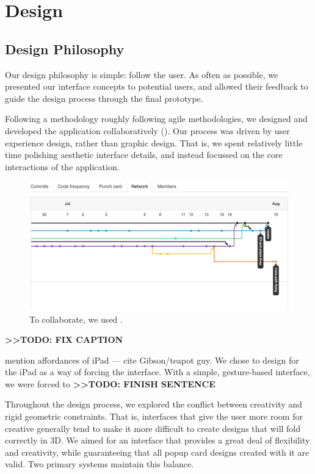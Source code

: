\chapter{Design}

\section{Design Philosophy}\label{design-philosophy}

Our design philosophy is simple: follow the user. As often as possible,
we presented our interface concepts to potential users, and allowed
their feedback to guide the design process through the final prototype.

Following a methodology roughly following agile methodologies, we
designed and developed the application collaboratively
(\citet{martin2003agile}). Our process was driven by user experience
design, rather than graphic design. That is, we spent relatively little
time polishing aesthetic interface details, and instead focussed on the
core interactions of the application.

\begin{figure}[htbp]
\centering
\includegraphics{figures/30_UI_Design_Philosophy/gitflow.png}
\caption{To collaborate, we used .}
\end{figure}

\textbf{\textgreater{}\textgreater{}TODO: FIX CAPTION}

mention affordances of iPad --- cite Gibson/teapot guy. We chose to
design for the iPad as a way of forcing the interface. With a simple,
gesture-based interface, we were forced to
\textbf{\textgreater{}\textgreater{}TODO: FINISH SENTENCE}

Throughout the design process, we explored the conflict between
creativity and rigid geometric constraints. That is, interfaces that
give the user more room for creative generally tend to make it more
difficult to create designs that will fold correctly in 3D. We aimed for
an interface that provides a great deal of flexibility and creativity,
while guaranteeing that all popup card designs created with it are
valid. Two primary systems maintain this balance.

